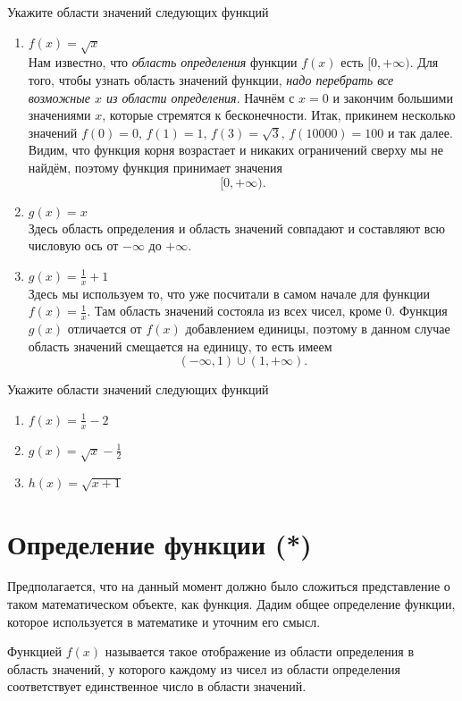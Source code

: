 \documentclass[11pt,fleqn]{book} %
\begin{document}
\begin{example}
Укажите области значений следующих функций 
\begin{enumerate}
\item $f(x) = \sqrt{x}$ \\
Нам известно, что \textit{область определения} функции $f(x)$ есть $[0, +\infty)$. Для того, чтобы узнать область значений функции, \emph{надо перебрать все возможные $x$ из области определения}. Начнём с $x = 0$ и закончим большими значениями $x$, которые стремятся к бесконечности. Итак, прикинем несколько значений $f(0) = 0,\, f(1) = 1,\, f(3) = \sqrt{3},\, f(10000) = 100$ и так далее. Видим, что функция корня возрастает и никаких ограничений сверху мы не найдём, поэтому функция принимает значения $$[0, +\infty).$$
\item $g(x) = x$ \\
Здесь область определения и область значений совпадают и составляют всю числовую ось от $-\infty$ до $+\infty$.
\item $g(x) = \frac{1}{x} + 1$ \\
Здесь мы используем то, что уже посчитали в самом начале для функции $f(x) = \frac{1}{x}$. Там область значений состояла из всех чисел, кроме $0$. Функция $g(x)$ отличается от $f(x)$ добавлением единицы, поэтому в данном случае область значений смещается на единицу, то есть имеем $$(-\infty, 1)\cup(1, +\infty).$$
\end{enumerate}
\end{example}

\begin{exercise}
Укажите области значений следующих функций 
\begin{enumerate}
\item $f(x) = \frac{1}{x} - 2$
\item $g(x) = \sqrt{x} - \frac{1}{2}$
\item $h(x) = \sqrt{x+1}$
\end{enumerate}
\end{exercise}


\section{Определение функции (*)}

Предполагается, что на данный момент должно было сложиться представление о таком математическом объекте, как функция. Дадим общее определение функции, которое используется в математике и уточним его смысл.

\begin{definition}
Функцией $f(x)$ называется такое отображение из области определения в область значений, у которого каждому из чисел из области определения соответствует единственное число в области значений.
\end{definition}
\end{document}
